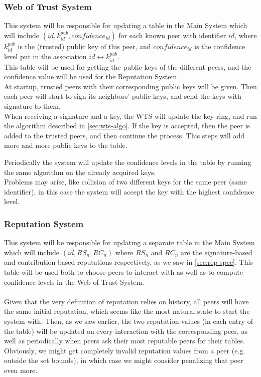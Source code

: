 \documentclass[]{article}
\begin{document}
\subsubsection{Web of Trust System}
This system will be responsible for updating a table in the Main System which will include $(id, k^{pub}_{id}, confidence_{id})$ for each known peer with identifier $id$, where $k^{pub}_{id}$ is the (trusted) public key of this peer, and $confidence_{id}$ is the confidence level put in the association $id \leftrightarrow k^{pub}_{id}$. \\
This table will be used for getting the public keys of the different peers, and the confidence value will be used for the Reputation System. \\

At startup, trusted peers with their corresponding public keys will be given. Then each peer will start to sign its neighbors' public keys, and send the keys with signature to them. \\
When receiving a signature and a key, the WTS will update the key ring, and run the algorithm described in \ref{sec:wts-algo}. If the key is accepted, then the peer is added to the trusted peers, and then continue the process.
This steps will add more and more public keys to the table. 

Periodically the system will update the confidence levels in the table by running the same algorithm on the already acquired keys. \\

Problems may arise, like collision of two different keys for the same peer (same identifier), in this case the system will accept the key with the highest confidence level.

\subsubsection{Reputation System}
This system will be responsible for updating a separate table in the Main System which will include $(id, RS_n, RC_n)$ where $RS_n$ and $RC_n$ are the signature-based and contribution-based reputations respectively, as we saw in \ref{sec:rep-spec}.
This table will be used both to choose peers to interact with as well as to compute confidence levels in the Web of Trust System.
\\\\
Given that the very definition of reputation relies on history, all peers will have the same initial reputation, which seems like the most natural state to start the system with.
Then, as we saw earlier, the two reputation values (in each entry of the table) will be updated on every interaction with the corresponding peer, as well as periodically when peers ask their most reputable peers for their tables.
\\
Obviously, we might get completely invalid reputation values from a peer (e.g. outside the set bounds), in which case we might consider penalizing that peer even more.
\end{document}

